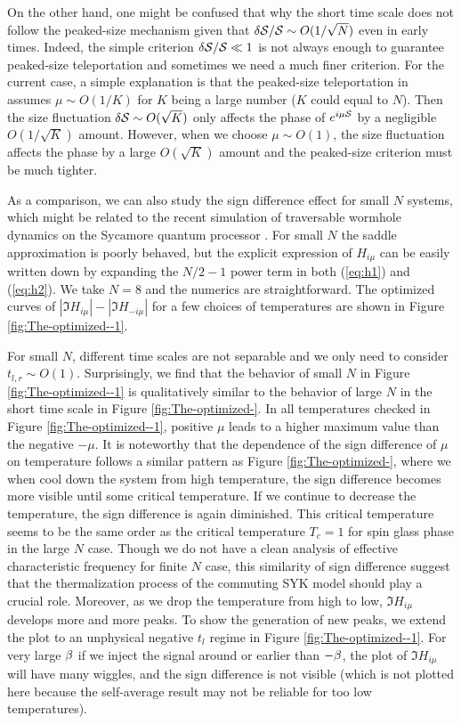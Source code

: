 \documentclass[11pt]{article}
\renewcommand{\>}{\rangle}
\newcommand{\<}{\langle}
\begin{document}
On the other hand, one might be confused that why the short time scale does not follow
the peaked-size mechanism given that $\delta\mathcal{S}/\mathcal{S}\sim O(1/\sqrt{N})$
even in early times. Indeed, the simple criterion $\delta\mathcal{S}/\mathcal{S}\ll1$
is not always enough to guarantee peaked-size teleportation \cite{Schuster:2021uvg}
and sometimes we need a much finer criterion. For the current case,
a simple explanation is that the peaked-size teleportation in \cite{Schuster:2021uvg}
assumes $\mu\sim O(1/K)$ for $K$ being a large number ($K$ could
equal to $N$). Then the size fluctuation $\delta\mathcal{S}\sim O(\sqrt{K})$
only affects the phase of $e^{i\mu\mathcal{S}}$ by a negligible $O(1/\sqrt{K})$
amount. However, when we choose $\mu\sim O(1)$, the size fluctuation
affects the phase by a large $O(\sqrt{K})$ amount and the peaked-size
criterion must be much tighter.

As a comparison, we can also study the sign difference effect for small $N$
systems, which might be related to the recent simulation of traversable
wormhole dynamics on the Sycamore quantum processor \cite{Jafferis:2022crx}.
For small $N$ the saddle approximation is poorly behaved, but the
explicit expression of $H_{i\mu}$ can be easily written down by expanding
the $N/2-1$ power term in both (\ref{eq:h1}) and (\ref{eq:h2}).
We take $N=8$ and the numerics are straightforward. The optimized
curves of $|\Im H_{i\mu}|-$$|\Im H_{-i\mu}|$ for a few choices
of temperatures are shown in Figure \ref{fig:The-optimized--1}.


For small $N$, different time scales are not separable and we only
need to consider $t_{l,r}\sim O(1)$. Surprisingly, we find that the
behavior of small $N$ in Figure \ref{fig:The-optimized--1} is qualitatively
similar to the behavior of large $N$ in the short time scale in Figure
\ref{fig:The-optimized-}. In all temperatures checked in Figure \ref{fig:The-optimized--1},
positive $\mu$ leads to a higher maximum value than the negative
$-\mu$. It is noteworthy that the dependence of the sign
difference of $\mu$ on temperature follows a similar pattern as Figure
\ref{fig:The-optimized-}, where we when cool down the system from high temperature, the sign difference becomes more visible until some critical temperature. If we continue to decrease the temperature, the sign difference is again diminished. This critical temperature seems to be the same order as the critical temperature $T_c=1$ for spin glass phase in the large $N$ case. Though we do not have a clean analysis of effective characteristic frequency for finite $N$ case, this similarity of sign difference suggest that the thermalization process of the commuting SYK model should play a crucial role. Moreover, as we drop the temperature
from high to low, $\Im H_{i\mu}$ develops more and more peaks. To show the generation of new peaks, we
extend the plot to an unphysical negative $t_{l}$ regime in Figure
\ref{fig:The-optimized--1}. For very large $\beta$ if we inject the signal
around or earlier than $-\beta$, the plot of $\Im H_{i\mu}$ will have
many wiggles, and the sign difference is not visible (which is not plotted here because the self-average result may not be reliable for too low temperatures).
\end{document}
